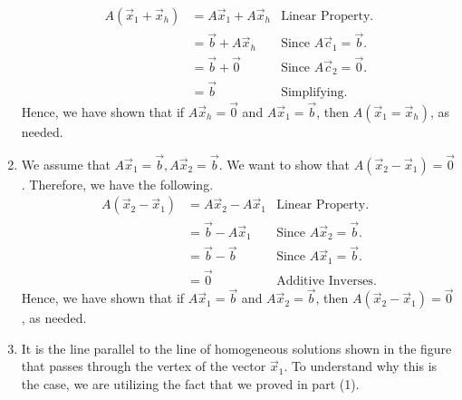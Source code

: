 \begin{SaveQuestion}
\begin{enumerate}
        \begin{align*}
            A(\vec x_1 + \vec x_h)  &= A\vec x_1 + A\vec x_h    &\text{Linear Property.} \\
                                    &= \vec b + A\vec x_h       &\text{Since $A\vec c_1
                                    = \vec b$.} \\
                                    &= \vec b + \vec 0          &\text{Since $A\vec c_2
                                    = \vec 0$.} \\
                                    &= \vec b                   &\text{Simplifying.}
        \end{align*}
        Hence, we have shown that if $A\vec x_h = \vec 0$ and $A \vec x_1 = \vec b$, then $A(\vec x_1 = \vec x_h)$, as needed. 

        \item We assume that $A\vec x_1 = \vec b, A \vec x_2 = \vec b$. We want to show that $A(\vec x_2 - \vec x_1) = \vec 0$. Therefore, we have the following.
        \begin{align*}
            A(\vec x_2 - \vec x_1)  &= A\vec x_2 - A \vec x_1   &\text{Linear Property.} \\           
                                    &= \vec b - A \vec x_1      &\text{Since $A\vec x_2 = \vec b$.} \\
                                    &= \vec b - \vec b          &\text{Since $A\vec x_1 = \vec b$.} \\
                                    &= \vec 0                   &\text{Additive Inverses.}
        \end{align*}
        Hence, we have shown that if $A\vec x_1 = \vec b$ and $A \vec x_2 = \vec b$, then $A(\vec x_2 - \vec x_1) = \vec 0$, as needed.
        
        \item It is the line parallel to the line of homogeneous solutions shown in the figure that passes through the vertex of the vector $\vec x_1$. To understand why this is the case, we are utilizing the fact that we proved in part (1). 
    \end{enumerate}
\end{SaveQuestion}


